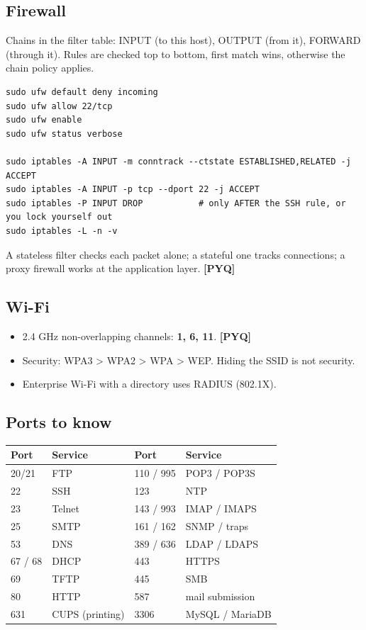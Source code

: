 \documentclass[11pt,a4paper]{article}
\newcommand{\pyq}{\textcolor{ember}{\scriptsize\textbf{[PYQ]}}}
\begin{document}
\subsection{Firewall}
Chains in the filter table: INPUT (to this host), OUTPUT (from it), FORWARD (through it). Rules are checked top to bottom, first match wins, otherwise the chain policy applies.

\begin{lstlisting}
sudo ufw default deny incoming
sudo ufw allow 22/tcp
sudo ufw enable
sudo ufw status verbose

sudo iptables -A INPUT -m conntrack --ctstate ESTABLISHED,RELATED -j ACCEPT
sudo iptables -A INPUT -p tcp --dport 22 -j ACCEPT
sudo iptables -P INPUT DROP           # only AFTER the SSH rule, or you lock yourself out
sudo iptables -L -n -v
\end{lstlisting}
A stateless filter checks each packet alone; a stateful one tracks connections; a proxy firewall works at the application layer. \pyq{}

\subsection{Wi-Fi}
\begin{itemize}
\item 2.4 GHz non-overlapping channels: \textbf{1, 6, 11}. \pyq{}
\item Security: WPA3 > WPA2 > WPA > WEP. Hiding the SSID is not security.
\item Enterprise Wi-Fi with a directory uses RADIUS (802.1X).
\end{itemize}
\subsection{Ports to know}
\begin{center}\small\renewcommand{\arraystretch}{1.18}\setlength{\tabcolsep}{9pt}
\begin{tabular}{@{}llll@{}}
\toprule
\textbf{\color{slate}Port} & \textbf{\color{slate}Service} & \textbf{\color{slate}Port} & \textbf{\color{slate}Service} \\ \midrule
20/21 & FTP & 110 / 995 & POP3 / POP3S \\
22 & SSH & 123 & NTP \\
23 & Telnet & 143 / 993 & IMAP / IMAPS \\
25 & SMTP & 161 / 162 & SNMP / traps \\
53 & DNS & 389 / 636 & LDAP / LDAPS \\
67 / 68 & DHCP & 443 & HTTPS \\
69 & TFTP & 445 & SMB \\
80 & HTTP & 587 & mail submission \\
631 & CUPS (printing) & 3306 & MySQL / MariaDB \\
\bottomrule
\end{tabular}\end{center}
\end{document}
